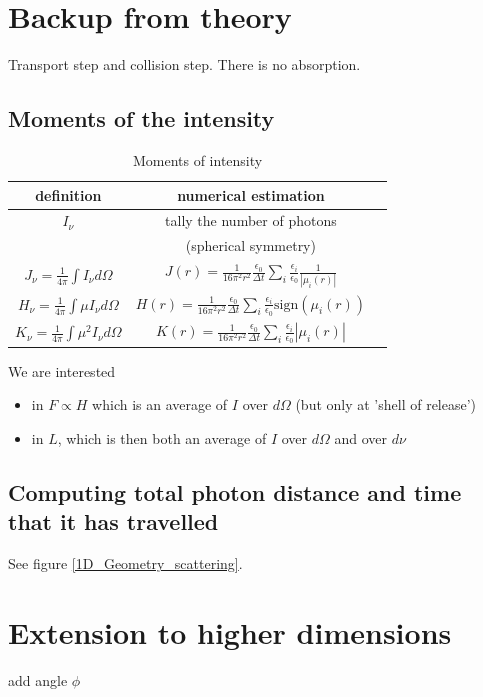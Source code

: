 \documentclass[../main/main.tex]{subfiles}
\begin{document}
\newpage
\section{Backup from theory}
Transport step and collision step. There is no absorption.

\subsection{Moments of the intensity}
\begin{table}[!htp]
\centering
{\tabulinesep=1.5mm
\begin{tabu}{|c|c|c|}
\hline 
definition & numerical estimation \\ \hline
$I_{\nu}$ & tally the number of photons \\ 
 & (spherical symmetry) \\ \hline
$J_{\nu} = \frac{1}{4 \pi} \int I_{\nu} d\Omega$ 
	& $J(r) = \frac{1}{16 \pi^2 r^2} \frac{\epsilon_0}{\Delta t} \sum_i \frac{\epsilon_i}{\epsilon_0} \frac{1}{|\mu_i(r)|}$ \\ \hline
$H_{\nu} = \frac{1}{4 \pi} \int \mu I_{\nu} d\Omega$ 
	& $H(r) = \frac{1}{16 \pi^2 r^2} \frac{\epsilon_0}{\Delta t} \sum_i \frac{\epsilon_i}{\epsilon_0} \text{sign}(\mu_i(r))$ \\ \hline
$K_{\nu} = \frac{1}{4 \pi} \int \mu^2 I_{\nu} d\Omega$ 
	& $K(r) = \frac{1}{16 \pi^2 r^2} \frac{\epsilon_0}{\Delta t} \sum_i \frac{\epsilon_i}{\epsilon_0} |\mu_i(r)|$ \\ \hline
\end{tabu}}
\caption{Moments of intensity}
\label{compu_moments_intensity}
\end{table}

We are interested 
\begin{itemize}
\item in $F \propto H$ which is an average of $I$ over $d \Omega$ (but only at 'shell of release')
\item in $L$, which is then both an average of $I$ over $d\Omega$ and over $d\nu$
\end{itemize}

\subsection{Computing total photon distance and time that it has travelled}
See figure \ref{1D_Geometry_scattering}.

\newpage
\section{Extension to higher dimensions}
add angle $\phi$
\end{document}
